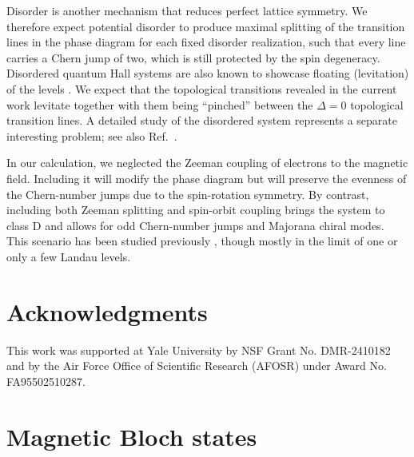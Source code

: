 \documentclass[10pt,prb,aps,superscriptaddress,amsmath,amssymb,twocolumn,floatfix,longbibliography]{revtex4-1}
\begin{document}
Disorder is another mechanism that reduces perfect lattice symmetry. 
We therefore expect potential disorder to produce maximal splitting of the transition lines in the phase diagram for each fixed disorder realization, such that every line carries a Chern jump of two, which is still protected by the spin degeneracy. 
Disordered quantum Hall systems are also known to showcase floating (levitation) of the levels \cite{Khmelnitsky, LaughlinLevitation}. We expect that the topological transitions revealed in the current work levitate together with them being ``pinched'' between the $\Delta = 0$ topological transition lines. 
A detailed study of the disordered system represents a separate interesting problem; see also Ref.~.

In our calculation, we neglected the Zeeman coupling of electrons to the magnetic field. Including it will modify the phase diagram but will preserve the evenness of the Chern-number jumps due to the spin-rotation symmetry. By contrast, including both Zeeman splitting and spin-orbit coupling brings the system to class D\cite{AltlandZirnbauer} and allows for odd Chern-number jumps and Majorana chiral modes. This scenario has been studied previously \cite{Jain2022helical, McDonald_new, MishmashYazdaniZaletel}, though mostly in the limit of one or only a few Landau levels.

\section{Acknowledgments}
This work was supported at Yale University by NSF Grant No. DMR-2410182 and by the Air Force Office of Scientific Research (AFOSR) under Award No. FA95502510287.



\appendix 

\section{Magnetic Bloch states}
\label{app:magnetic-bloch-states}
\end{document}

